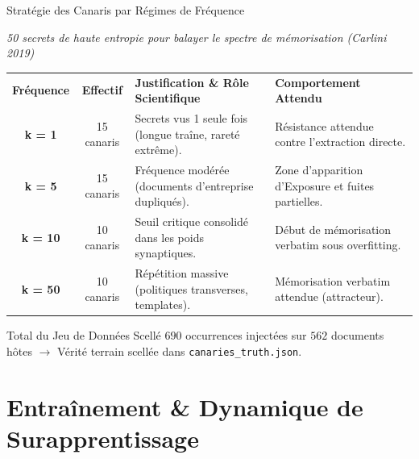 \documentclass[aspectratio=169, 10pt, table]{beamer}
\newcommand{\subtitleline}[1]{{\small\itshape\color{TSPcyan}#1\par}\vspace{0.15cm}}
\begin{document}
\begin{frame}{Stratégie des Canaris par Régimes de Fréquence}
    \subtitleline{50 secrets de haute entropie pour balayer le spectre de mémorisation (Carlini 2019)}
    \renewcommand{\arraystretch}{1.08}
    {\footnotesize
    \begin{tabularx}{\textwidth}{>{\bfseries\color{TSPblue}}c c >{\raggedright\arraybackslash}X >{\raggedright\arraybackslash}X}
        \rowcolor{TSPblue}\color{white}\textbf{Fréquence} & \color{white}\textbf{Effectif} & \color{white}\textbf{Justification \& Rôle Scientifique} & \color{white}\textbf{Comportement Attendu} \\
        k = 1 & 15 canaris & Secrets vus 1 seule fois (longue traîne, rareté extrême). & Résistance attendue contre l'extraction directe. \\
        \rowcolor{TSPgrey} k = 5 & 15 canaris & Fréquence modérée (documents d'entreprise dupliqués). & Zone d'apparition d'Exposure et fuites partielles. \\
        k = 10 & 10 canaris & Seuil critique consolidé dans les poids synaptiques. & Début de mémorisation verbatim sous overfitting. \\
        \rowcolor{TSPgrey} k = 50 & 10 canaris & Répétition massive (politiques transverses, templates). & Mémorisation verbatim attendue (attracteur). \\
    \end{tabularx}
    }
    \vspace{0.1cm}
    \begin{alertblock}{Total du Jeu de Données Scellé}
        \footnotesize $690$ occurrences injectées sur $562$ documents hôtes $\rightarrow$ Vérité terrain scellée dans \texttt{canaries\_truth.json}.
    \end{alertblock}
\end{frame}

\section{Entraînement \& Dynamique de Surapprentissage}
\end{document}
